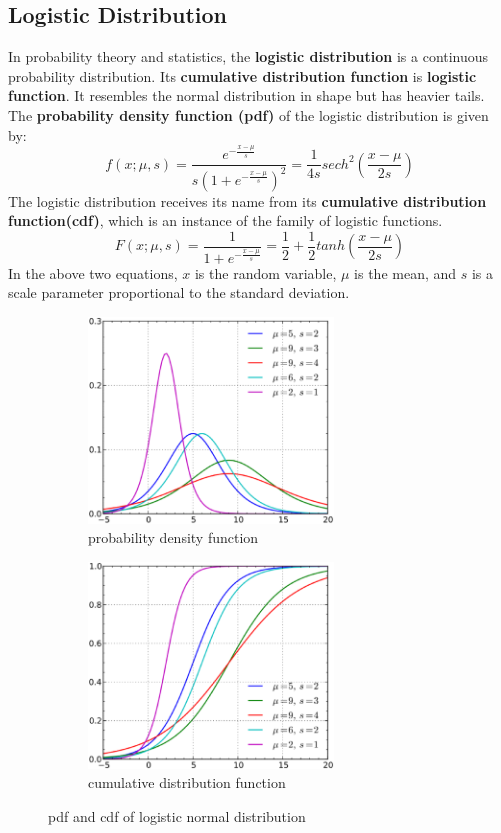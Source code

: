\documentclass{article} %
\begin{document}
\subsection{Logistic Distribution}
In probability theory and statistics, the \textbf{logistic distribution} is a continuous probability distribution. Its \textbf{cumulative distribution function} is \textbf{logistic function}. It resembles the normal distribution in shape but has heavier tails. The \textbf{probability density function (pdf)} of the logistic distribution is given by:
\begin{equation}
f\left( x;\mu ,s \right) = \frac{e^{-\frac{x-\mu}{s}}}{s\left(1+e^{-\frac{x-\mu}{s}} \right )^2} = \frac{1}{4s}sech^2\left(\frac{x-\mu}{2s} \right)
\end{equation}
The logistic distribution receives its name from its \textbf{cumulative distribution function(cdf)}, which is an instance of the family of logistic functions.
\begin{equation}
F\left( x;\mu ,s \right) = \frac{1}{1+e^{-\frac{x-\mu}{s}}} = \frac{1}{2}+\frac{1}{2}tanh\left(\frac{x-\mu}{2s} \right)
\end{equation}
In the above two equations, $x$ is the random variable, $\mu$ is the mean, and $s$ is a scale parameter proportional to the standard deviation.
\begin{figure}[htb]
	\centering
	\begin{subfigure}{0.5\textwidth}
		\includegraphics[width=6.5cm]{640px-Logisticpdfunction}
		\caption{probability density function}
	\end{subfigure}%
	\begin{subfigure}{0.5\textwidth}
		\includegraphics[width=6.5cm]{640px-Logistic_cdf}
		\caption{cumulative distribution function}
	\end{subfigure}
	\caption{pdf and cdf of logistic normal distribution}
\end{figure}
\end{document}
